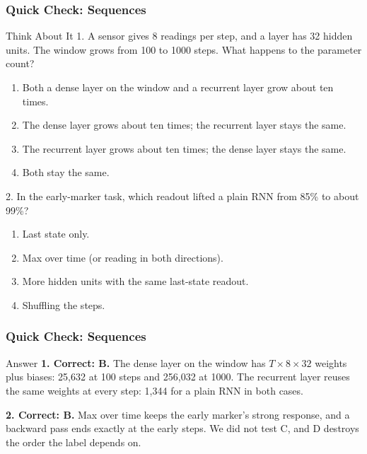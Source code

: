\begin{frame}[fragile] \frametitle{Quick Check: Sequences}
\begin{block}{Think About It}
1. A sensor gives 8 readings per step, and a layer has 32 hidden units. The window grows from 100 to 1000 steps. What happens to the parameter count?
\begin{enumerate}
  \item[A.] Both a dense layer on the window and a recurrent layer grow about ten times.
  \item[B.] The dense layer grows about ten times; the recurrent layer stays the same.
  \item[C.] The recurrent layer grows about ten times; the dense layer stays the same.
  \item[D.] Both stay the same.
\end{enumerate}
2. In the early-marker task, which readout lifted a plain RNN from 85\% to about 99\%?
\begin{enumerate}
  \item[A.] Last state only.
  \item[B.] Max over time (or reading in both directions).
  \item[C.] More hidden units with the same last-state readout.
  \item[D.] Shuffling the steps.
\end{enumerate}
\end{block}
\end{frame}

\begin{frame}[fragile] \frametitle{Quick Check: Sequences}
\begin{block}{Answer}
\textbf{1. Correct: B.} The dense layer on the window has $T \times 8 \times 32$ weights plus biases: 25,632 at 100 steps and 256,032 at 1000. The recurrent layer reuses the same weights at every step: 1,344 for a plain RNN in both cases.

\textbf{2. Correct: B.} Max over time keeps the early marker's strong response, and a backward pass ends exactly at the early steps. We did not test C, and D destroys the order the label depends on.
\end{block}
\end{frame}

